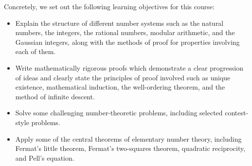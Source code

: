 Concretely, we set out the following learning objectives for this course:
\begin{itemize}
\item Explain the structure of different number systems such as the natural numbers, the integers, the rational numbers, modular arithmetic, and the Gaussian integers, along with the methods of proof for properties involving each of them.
\item Write mathematically rigorous proofs which demonstrate a clear progression of ideas and clearly state the principles of proof involved such as unique existence, mathematical induction, the well-ordering theorem, and the method of infinite descent.
\item Solve some challenging number-theoretic problems, including selected contest-style problems.
\item Apply some of the central theorems of elementary number theory, including Fermat's little theorem, Fermat's two-squares theorem, quadratic reciprocity, and Pell's equation.
\end{itemize}




